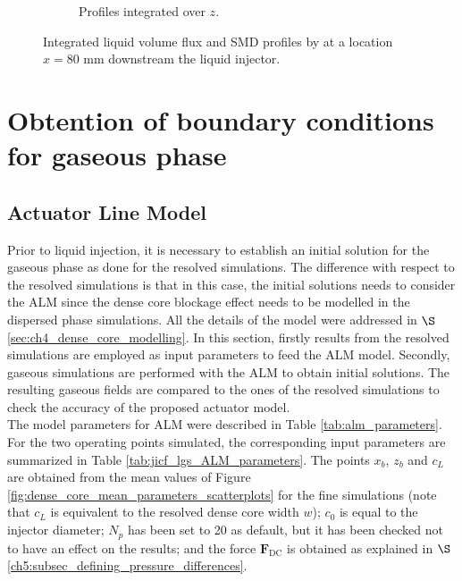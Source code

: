 \begin{figure}[h!]
\begin{subfigure}[b]{0.45\textwidth}
   \caption{Profiles integrated over $z$.}
  \label{fig:integrated_results_Becker_expe_results_over_z}
\end{subfigure}
\caption[{Integrated liquid volume flux and SMD profiles by  at a location $x = 80$ mm downstream the liquid injector.}]{Integrated liquid volume flux and SMD profiles by  at a location $x = 80$ mm downstream the liquid injector. }
\label{fig:integrated_results_Becker_expe_results}
\end{figure}

\section{Obtention of boundary conditions for gaseous phase}
\label{sec:ch6_BC_gaseous_phase}

\subsection{Actuator Line Model}

Prior to liquid injection, it is necessary to establish an initial solution for the gaseous phase as done for the resolved simulations. The difference with respect to the resolved simulations is that in this case, the initial solutions needs to consider the ALM since the dense core blockage effect needs to be modelled in the dispersed phase simulations. All the details of the model were addressed in $\S$\ref{sec:ch4_dense_core_modelling}. In this section, firstly results from the resolved simulations are employed as input parameters to feed the ALM model. Secondly, gaseous simulations are performed with the ALM to obtain initial solutions. The resulting gaseous fields are compared to the ones of the resolved simulations to check the accuracy of the proposed actuator model. \\


The model parameters for ALM were described in Table \ref{tab:alm_parameters}. For the two operating points simulated, the corresponding input parameters are summarized in Table \ref{tab:jicf_lgs_ALM_parameters}. The points $x_b$, $z_b$ and $c_L$ are obtained from the mean values of Figure \ref{fig:dense_core_mean_parameters_scatterplots} for the fine simulations (note that $c_L$ is equivalent to the resolved dense core width $w$); $c_0$ is equal to the injector diameter; $N_p$ has been set to 20 as default, but it has been checked not to have an effect on the results; and the force $\textbf{F}_\mathrm{DC}$ is obtained as explained in $\S$\ref{ch5:subsec_defining_pressure_differences}.


